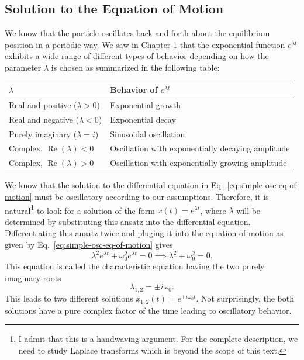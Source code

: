\documentclass[12pt]{article}
\begin{document}
\subsection{\label{sec:solution-simple-osc}Solution to the Equation of Motion}
We know that the particle oscillates back and forth about the equilibrium position in a periodic way. We saw in Chapter 1 that the exponential function $e^{\lambda t}$ exhibits a wide range of different types of behavior depending on how the parameter $\lambda$ is chosen as summarized in the following table:

\begin{table}[h]
    \centering
    \begin{tabular}{ll}
        \hline
        $\lambda$ & Behavior of $e^{\lambda t}$ \\
        \hline
        Real and positive ($\lambda > 0$) & Exponential growth \\
        Real and negative ($\lambda < 0$) & Exponential decay \\
        Purely imaginary ($\lambda = i$) & Sinusoidal oscillation \\
        Complex, $\operatorname{Re}(\lambda) < 0$ & Oscillation with exponentially decaying amplitude \\
        Complex, $\operatorname{Re}(\lambda) > 0$ & Oscillation with exponentially growing amplitude \\
        \hline
    \end{tabular}
\end{table}

We know that the solution to the differential equation in Eq.~\ref{eq:simple-osc-eq-of-motion} must be oscillatory according to our assumptions. Therefore, it is natural\footnote{I admit that this is a handwaving argument. For the complete description, we need to study Laplace transforms which is beyond the scope of this text.} to look for a solution of the form $x(t)=e^{\lambda t}$, where $\lambda$ will be determined by substituting this ansatz into the differential equation. Differentiating this ansatz twice and pluging it into the equation of motion as given by Eq.~\ref{eq:simple-osc-eq-of-motion} gives
\begin{equation}
    \lambda^2 e^{\lambda t}+ \omega_0^2 e^{\lambda t} = 0 \implies \lambda^2 + \omega_0^2 = 0.
\end{equation}
This equation is called the characteristic equation having the two purely imaginary roots
\begin{equation}
    \lambda_{1,2}=\pm i\omega_0.
\end{equation}
This leads to two different solutions
$x_{1,2}(t)=e^{\pm i\omega_0 t}$. Not surprisingly, the both solutions have a pure complex factor of the time leading to oscillatory behavior.
\end{document}
